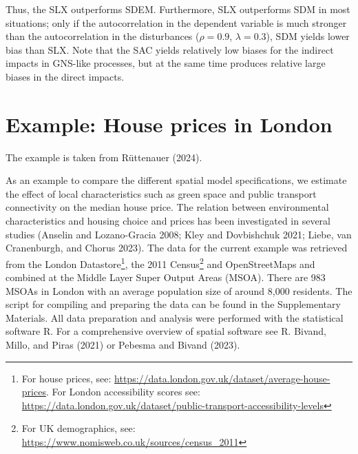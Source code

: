 \documentclass[
  letterpaper,
]{scrbook}
\begin{document}
Thus, the SLX outperforms SDEM. Furthermore, SLX outperforms SDM in most
situations; only if the autocorrelation in the dependent variable is
much stronger than the autocorrelation in the disturbances
(\(\rho=0.9\), \(\lambda=0.3\)), SDM yields lower bias than SLX. Note
that the SAC yields relatively low biases for the indirect impacts in
GNS-like processes, but at the same time produces relative large biases
in the direct impacts.

\hypertarget{example-house-prices-in-london}{%
\section{Example: House prices in
London}\label{example-house-prices-in-london}}

The example is taken from Rüttenauer (2024).

As an example to compare the different spatial model specifications, we
estimate the effect of local characteristics such as green space and
public transport connectivity on the median house price. The relation
between environmental characteristics and housing choice and prices has
been investigated in several studies (Anselin and Lozano-Gracia 2008;
Kley and Dovbishchuk 2021; Liebe, van Cranenburgh, and Chorus 2023). The
data for the current example was retrieved from the London
Datastore\footnote{For house prices, see:
  \url{https://data.london.gov.uk/dataset/average-house-prices}. For
  London accessibility scores see:
  \url{https://data.london.gov.uk/dataset/public-transport-accessibility-levels}},
the 2011 Census\footnote{For UK demographics, see:
  \url{https://www.nomisweb.co.uk/sources/census_2011}} and
OpenStreetMaps and combined at the Middle Layer Super Output Areas
(MSOA). There are 983 MSOAs in London with an average population size of
around 8,000 residents. The script for compiling and preparing the data
can be found in the Supplementary Materials. All data preparation and
analysis were performed with the statistical software R. For a
comprehensive overview of spatial software see R. Bivand, Millo, and
Piras (2021) or Pebesma and Bivand (2023).
\end{document}
